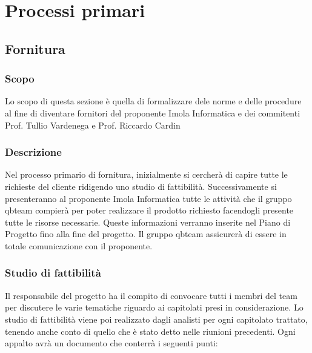 \section{Processi primari}
\subsection{Fornitura}
\subsubsection{Scopo}
Lo scopo di questa sezione è quella di formalizzare dele norme e delle procedure al fine di diventare fornitori del proponente Imola Informatica e dei commitenti Prof. Tullio Vardenega e Prof. Riccardo Cardin 


\subsubsection{Descrizione} 
Nel processo primario di fornitura, inizialmente si cercherà di capire tutte le richieste del cliente ridigendo uno studio di fattibilità. 
Successivamente si presenteranno al proponente Imola Informatica tutte le attività che il gruppo qbteam compierà per poter realizzare il prodotto richiesto facendogli presente tutte le risorse necessarie. Queste informazioni verranno inserite nel Piano di Progetto fino alla fine del progetto.
Il gruppo qbteam assicurerà di essere in totale comunicazione con il proponente.


\subsubsection{Studio di fattibilità}

Il responsabile del progetto ha il compito di convocare tutti i membri del team per discutere le varie tematiche riguardo ai capitolati presi in considerazione.
Lo studio di fattibilità viene poi realizzato dagli analisti per ogni capitolato trattato, tenendo anche conto di quello che è stato detto nelle riunioni precedenti. Ogni appalto avrà un documento che conterrà i seguenti punti:


